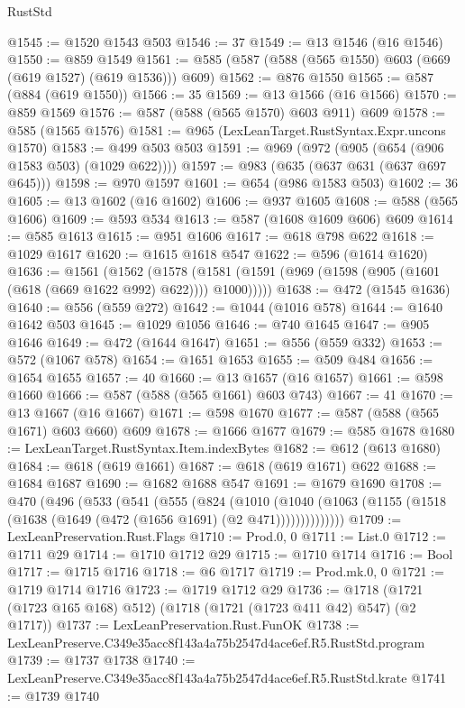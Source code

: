 \begin{lexlean}{RustStd}
\begin{coremodule}
@1545 := @1520 @1543 @503
@1546 := 37
@1549 := @13 @1546 (@16 @1546)
@1550 := @859 @1549
@1561 := @585 (@587 (@588 (@565 @1550) @603 (@669 (@619 @1527) (@619 @1536))) @609)
@1562 := @876 @1550
@1565 := @587 (@884 (@619 @1550))
@1566 := 35
@1569 := @13 @1566 (@16 @1566)
@1570 := @859 @1569
@1576 := @587 (@588 (@565 @1570) @603 @911) @609
@1578 := @585 (@1565 @1576)
@1581 := @965 (LexLeanTarget.RustSyntax.Expr.uncons @1570)
@1583 := @499 @503 @503
@1591 := @969 (@972 (@905 (@654 (@906 @1583 @503) (@1029 @622))))
@1597 := @983 (@635 (@637 @631 (@637 @697 @645)))
@1598 := @970 @1597
@1601 := @654 (@986 @1583 @503)
@1602 := 36
@1605 := @13 @1602 (@16 @1602)
@1606 := @937 @1605
@1608 := @588 (@565 @1606)
@1609 := @593 @534
@1613 := @587 (@1608 @1609 @606) @609
@1614 := @585 @1613
@1615 := @951 @1606
@1617 := @618 @798 @622
@1618 := @1029 @1617
@1620 := @1615 @1618 @547
@1622 := @596 (@1614 @1620)
@1636 := @1561
    (@1562
      (@1578 (@1581 (@1591 (@969 (@1598 (@905 (@1601 (@618 (@669 @1622 @992) @622)))) @1000)))))
@1638 := @472 (@1545 @1636)
@1640 := @556 (@559 @272)
@1642 := @1044 (@1016 @578)
@1644 := @1640 @1642 @503
@1645 := @1029 @1056
@1646 := @740 @1645
@1647 := @905 @1646
@1649 := @472 (@1644 @1647)
@1651 := @556 (@559 @332)
@1653 := @572 (@1067 @578)
@1654 := @1651 @1653
@1655 := @509 @484
@1656 := @1654 @1655
@1657 := 40
@1660 := @13 @1657 (@16 @1657)
@1661 := @598 @1660
@1666 := @587 (@588 (@565 @1661) @603 @743)
@1667 := 41
@1670 := @13 @1667 (@16 @1667)
@1671 := @598 @1670
@1677 := @587 (@588 (@565 @1671) @603 @660) @609
@1678 := @1666 @1677
@1679 := @585 @1678
@1680 := LexLeanTarget.RustSyntax.Item.indexBytes
@1682 := @612 (@613 @1680)
@1684 := @618 (@619 @1661)
@1687 := @618 (@619 @1671) @622
@1688 := @1684 @1687
@1690 := @1682 @1688 @547
@1691 := @1679 @1690
@1708 := @470
    (@496
      (@533
        (@541
          (@555
            (@824
              (@1010
                (@1040 (@1063 (@1155 (@1518 (@1638 (@1649 (@472 (@1656 @1691) (@2 @471))))))))))))))
@1709 := LexLeanPreservation.Rust.Flags
@1710 := Prod.{0, 0}
@1711 := List.{0}
@1712 := @1711 @29
@1714 := @1710 @1712 @29
@1715 := @1710 @1714
@1716 := Bool
@1717 := @1715 @1716
@1718 := @6 @1717
@1719 := Prod.mk.{0, 0}
@1721 := @1719 @1714 @1716
@1723 := @1719 @1712 @29
@1736 := @1718 (@1721 (@1723 @165 @168) @512) (@1718 (@1721 (@1723 @411 @42) @547) (@2 @1717))
@1737 := LexLeanPreservation.Rust.FunOK
@1738 := LexLeanPreserve.C349e35acc8f143a4a75b2547d4ace6ef.R5.RustStd.program
@1739 := @1737 @1738
@1740 := LexLeanPreserve.C349e35acc8f143a4a75b2547d4ace6ef.R5.RustStd.krate
@1741 := @1739 @1740

\end{coremodule}
\end{lexlean}
